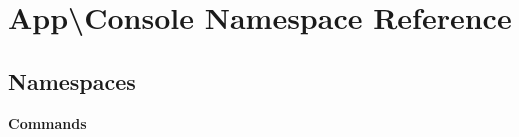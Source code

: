 \section{App\textbackslash{}Console Namespace Reference}
\label{namespace_app_1_1_console}
\subsection*{Namespaces}
\begin{DoxyCompactItemize}
\item 
 {\bf Commands}
\end{DoxyCompactItemize}
